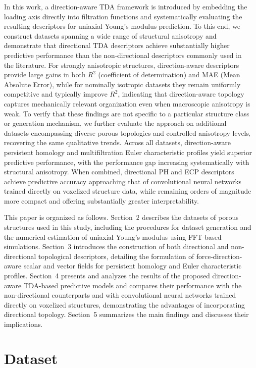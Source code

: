 \documentclass[sn-mathphys,Numbered]{sn-jnl}
\theoremstyle{definition}
\begin{document}
In this work, a direction-aware TDA framework is introduced by embedding the loading axis directly into filtration functions and systematically evaluating the resulting descriptors for uniaxial Young’s modulus prediction. To this end, we construct datasets spanning a wide range of structural anisotropy and demonstrate that directional TDA descriptors achieve substantially higher predictive performance than the non-directional descriptors commonly used in the literature. 
For strongly anisotropic structures, direction-aware descriptors provide large gains in both $R^2$ (coefficient of determination) and MAE (Mean Absolute Error), while for nominally isotropic datasets they remain uniformly competitive and typically improve $R^2$, indicating that direction-aware topology captures mechanically relevant organization even when macroscopic anisotropy is weak.
To verify that these findings are not specific to a particular structure class or generation mechanism, we further evaluate the approach on additional datasets encompassing diverse porous topologies and controlled anisotropy levels, recovering the same qualitative trends. Across all datasets, direction-aware persistent homology and multifiltration Euler characteristic profiles yield superior predictive performance, with the performance gap increasing systematically with structural anisotropy. When combined, directional PH and ECP descriptors achieve predictive accuracy approaching that of convolutional neural networks trained directly on voxelized structure data, while remaining orders of magnitude more compact and offering substantially greater interpretability.

This paper is organized as follows. Section~2 describes the datasets of porous structures used in this study, including the procedures for dataset generation and the numerical estimation of uniaxial Young’s modulus using FFT-based simulations. Section~3 introduces the construction of both directional and non-directional topological descriptors, detailing the formulation of force-direction-aware scalar and vector fields for persistent homology and Euler characteristic profiles. Section~4 presents and analyzes the results of the proposed direction-aware TDA-based predictive models and compares their performance with the non-directional counterparts and with convolutional neural networks trained directly on voxelized structures, demonstrating the advantages of incorporating directional topology. Section~5 summarizes the main findings and discusses their implications.

\section{Dataset}
\end{document}
